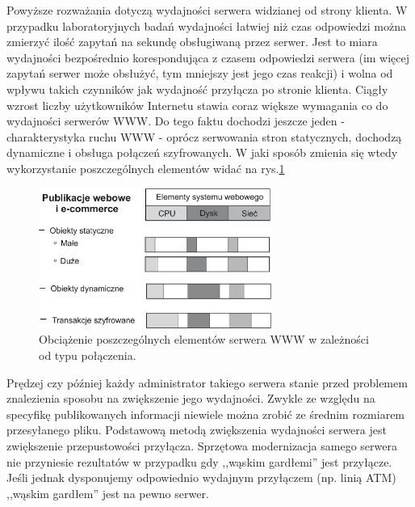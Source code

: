 Powyższe rozważania dotyczą wydajności serwera widzianej od strony klienta. W przypadku laboratoryjnych 
badań wydajności łatwiej niż czas odpowiedzi można zmierzyć ilość zapytań na sekundę obsługiwaną przez serwer. 
Jest to miara wydajności bezpośrednio korespondująca z czasem odpowiedzi serwera (im więcej zapytań serwer może 
obsłużyć, tym mniejszy jest jego czas reakcji) i wolna od wpływu takich czynników jak wydajność przyłącza po 
stronie klienta.
Ciągły wzrost liczby użytkowników Internetu stawia coraz większe wymagania co do wydajności serwerów WWW. Do tego faktu dochodzi jeszcze jeden - charakterystyka ruchu WWW - oprócz serwowania stron statycznych, dochodzą dynamiczne i obsługa połączeń szyfrowanych. 
W jaki sposób zmienia się wtedy wykorzystanie poszczególnych elementów widać na rys.\ref{charakterystyka}
\begin{figure}[h]
\centering
\includegraphics[width=3in]{./rysunki/charakterystyka_ruchu.eps}
\caption{Obciążenie poszczególnych elementów serwera WWW w zależności od typu połączenia.}
\label{charakterystyka}
\end{figure}

Prędzej czy później każdy administrator takiego serwera stanie przed problemem znalezienia sposobu na 
zwiększenie jego wydajności. Zwykle ze względu na specyfikę publikowanych informacji niewiele można zrobić ze 
średnim rozmiarem przesyłanego pliku. Podstawową metodą zwiększenia wydajności serwera jest zwiększenie 
przepustowości przyłącza. Sprzętowa modernizacja samego serwera nie przyniesie rezultatów w przypadku gdy 
,,wąskim gardłemi'' jest przyłącze. Jeśli jednak dysponujemy odpowiednio wydajnym przyłączem (np. linią ATM) 
,,wąskim gardłem'' jest na pewno serwer. 

